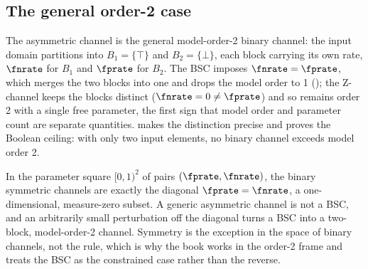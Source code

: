 \subsection*{The general order-2 case}

The asymmetric channel is the general model-order-2 binary channel: the input
domain partitions into $B_1 = \{\top\}$ and $B_2 = \{\bot\}$, each block
carrying its own rate, $\fnrate$ for $B_1$ and $\fprate$ for $B_2$. The BSC
imposes $\fnrate = \fprate$, which merges the two blocks into one and drops the
model order to 1 (); the Z-channel keeps the blocks
distinct ($\fnrate = 0 \neq \fprate$) and so remains order 2 with a single free
parameter, the first sign that model order and parameter count are separate
quantities.  makes the distinction precise and proves the
Boolean ceiling: with only two input elements, no binary channel exceeds model
order 2.

\begin{remark}
\label{rem:bsc-measure-zero}
In the parameter square $[0,1)^2$ of pairs $(\fprate, \fnrate)$, the binary
symmetric channels are exactly the diagonal $\fprate = \fnrate$, a
one-dimensional, measure-zero subset. A generic asymmetric channel is not a
BSC, and an arbitrarily small perturbation off the diagonal turns a BSC into a
two-block, model-order-2 channel. Symmetry is the exception in the space of
binary channels, not the rule, which is why the book works in the order-2 frame
and treats the BSC as the constrained case rather than the reverse.
\end{remark}
